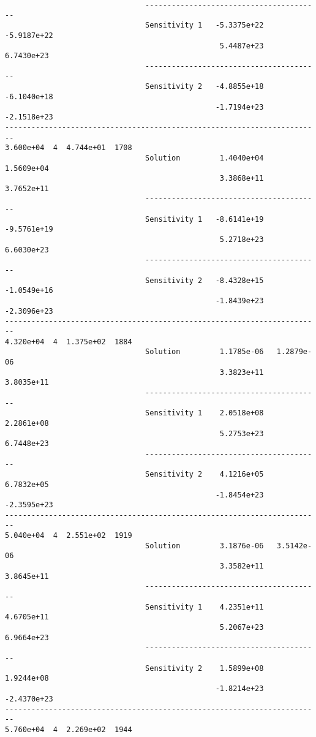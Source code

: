 \begin{verbatim}
                                ----------------------------------------
                                Sensitivity 1   -5.3375e+22  -5.9187e+22 
                                                 5.4487e+23   6.7430e+23 
                                ----------------------------------------
                                Sensitivity 2   -4.8855e+18  -6.1040e+18 
                                                -1.7194e+23  -2.1518e+23 
------------------------------------------------------------------------
3.600e+04  4  4.744e+01  1708
                                Solution         1.4040e+04   1.5609e+04 
                                                 3.3868e+11   3.7652e+11 
                                ----------------------------------------
                                Sensitivity 1   -8.6141e+19  -9.5761e+19 
                                                 5.2718e+23   6.6030e+23 
                                ----------------------------------------
                                Sensitivity 2   -8.4328e+15  -1.0549e+16 
                                                -1.8439e+23  -2.3096e+23 
------------------------------------------------------------------------
4.320e+04  4  1.375e+02  1884
                                Solution         1.1785e-06   1.2879e-06 
                                                 3.3823e+11   3.8035e+11 
                                ----------------------------------------
                                Sensitivity 1    2.0518e+08   2.2861e+08 
                                                 5.2753e+23   6.7448e+23 
                                ----------------------------------------
                                Sensitivity 2    4.1216e+05   6.7832e+05 
                                                -1.8454e+23  -2.3595e+23 
------------------------------------------------------------------------
5.040e+04  4  2.551e+02  1919
                                Solution         3.1876e-06   3.5142e-06 
                                                 3.3582e+11   3.8645e+11 
                                ----------------------------------------
                                Sensitivity 1    4.2351e+11   4.6705e+11 
                                                 5.2067e+23   6.9664e+23 
                                ----------------------------------------
                                Sensitivity 2    1.5899e+08   1.9244e+08 
                                                -1.8214e+23  -2.4370e+23 
------------------------------------------------------------------------
5.760e+04  4  2.269e+02  1944

\end{verbatim}
